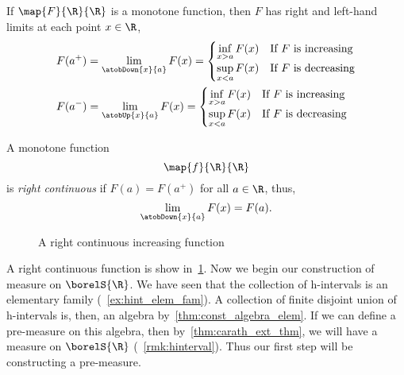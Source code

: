 \begin{Theorem}[name=Monotonic functions and one-sided limits]\label{thm:mono_func}
    If $\map{F}{\R}{\R}$ is a monotone function, then $F$ has right and left-hand limits at each
    point $x \in \R$,
    \begin{align*}
	&F(a^{+}) = \lim\limits_{\atobDown{x}{a}}F(x) =  
	\begin{cases}
	    \inf\limits_{x > a}F(x)& \text{If $F$ is increasing}\\
	    \sup\limits_{x < a}F(x)& \text{If $F$ is decreasing}
	\end{cases} \\
	&F(a^{-}) = \lim\limits_{\atobUp{x}{a}}F(x) = 
	\begin{cases}
	    \inf\limits_{x > a}F(x)& \text{If $F$ is increasing}\\
	    \sup\limits_{x < a}F(x)& \text{If $F$ is decreasing}
	\end{cases}
    \end{align*}
\end{Theorem}
\begin{Definition}[name=Right continuous function]
    A monotone function \[\map{f}{\R}{\R}\] is \emph{right continuous} if $F(a) = F(a^{+})$ for all
    $a\in\R$, thus,
    \[\lim\limits_{\atobDown{x}{a}}F(x) = F(a).\]
\end{Definition}
\begin{figure}
    
    \caption{A right continuous increasing function}\label{fig:tikz:right_continuous}
\end{figure}
A right continuous function is show in~\ref{fig:tikz:right_continuous}.
Now we begin our construction of measure on $\borelS{\R}$. We have seen that the collection of
h-intervals is an elementary family (~\ref{ex:hint_elem_fam}). 
A collection of finite disjoint union of h-intervals is, then, an
algebra by~\ref{thm:const_algebra_elem}. If we can define a pre-measure on this algebra, then
by~\ref{thm:carath_ext_thm}, we will have a measure on $\borelS{\R}$ (~\ref{rmk:hinterval}). 
Thus our first step will be
constructing a pre-measure.

